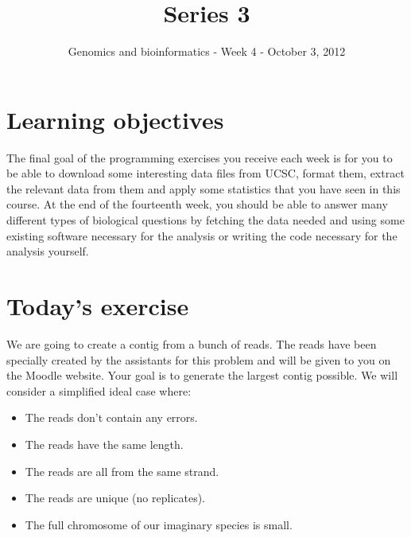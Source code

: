 \documentclass[a4paper,11pt]{article}
\title{Series 3}
\date{}
\author{Genomics and bioinformatics - Week 4 - October 3, 2012}
\begin{document}
\maketitle

\section{Learning objectives}
The final goal of the programming exercises you receive each week is for you to be able to download some interesting data files from UCSC, format them, extract the relevant data from them and apply some statistics that you have seen in this course. At the end of the fourteenth week, you should be able to answer many different types of biological questions by fetching the data needed and using some existing software necessary for the analysis or writing the code necessary for the analysis yourself.

\section{Today's exercise}
We are going to create a contig from a bunch of reads. The reads have been specially created by the assistants for this problem and will be given to you on the Moodle website. Your goal is to generate the largest contig possible. We will consider a simplified ideal case where:
\begin{itemize}
\item The reads don't contain any errors.
\item The reads have the same length.
\item The reads are all from the same strand.
\item The reads are unique (no replicates).
\item The full chromosome of our imaginary species is small.
\end{itemize}
\end{document}
